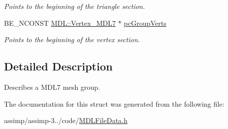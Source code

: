\begin{DoxyCompactItemize}
\begin{DoxyCompactList}\small\item\em Points to the beginning of the triangle section. \end{DoxyCompactList}\item 
\hypertarget{struct_assimp_1_1_m_d_l_1_1_int_group_info___m_d_l7_a7e8131cd1fead87104f4d964cc546684}{B\+E\+\_\+\+N\+C\+O\+N\+S\+T \hyperlink{struct_assimp_1_1_m_d_l_1_1_vertex___m_d_l7}{M\+D\+L\+::\+Vertex\+\_\+\+M\+D\+L7} $\ast$ \hyperlink{struct_assimp_1_1_m_d_l_1_1_int_group_info___m_d_l7_a7e8131cd1fead87104f4d964cc546684}{pc\+Group\+Verts}}\label{struct_assimp_1_1_m_d_l_1_1_int_group_info___m_d_l7_a7e8131cd1fead87104f4d964cc546684}

\begin{DoxyCompactList}\small\item\em Points to the beginning of the vertex section. \end{DoxyCompactList}\end{DoxyCompactItemize}


\subsection{Detailed Description}
Describes a M\+D\+L7 mesh group. 

The documentation for this struct was generated from the following file\+:\begin{DoxyCompactItemize}
\item 
assimp/assimp-\/3../code/\hyperlink{_m_d_l_file_data_8h}{M\+D\+L\+File\+Data.\+h}\end{DoxyCompactItemize}
